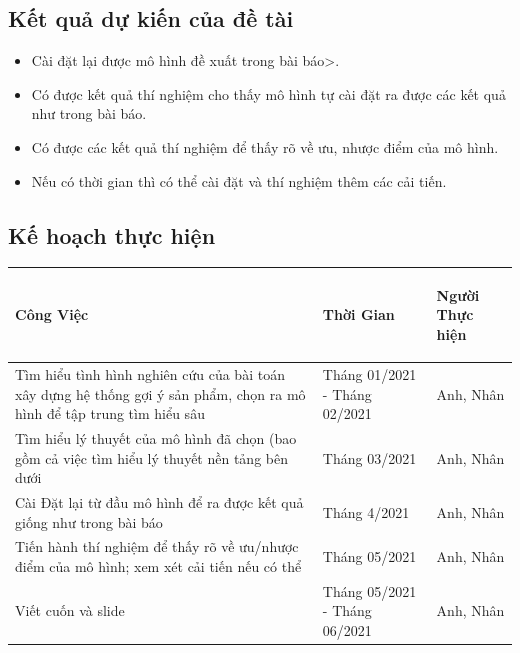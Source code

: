 \documentclass{article}[14pt]
\begin{document}
{    
    \subsection{Kết quả dự kiến của đề tài}
        
    \begin{itemize}
        \item Cài đặt lại được mô hình đề xuất trong bài báo\cite{mvae}>.
        \item Có được kết quả thí nghiệm cho thấy mô hình tự cài đặt ra được 
các kết quả như trong bài báo.
        \item Có được các kết quả thí nghiệm để thấy rõ về ưu, nhược điểm 
của mô hình.
        \item Nếu có thời gian thì có thể cài đặt và thí nghiệm thêm các cải 
tiến.
    \end{itemize}
    
    \subsection{Kế hoạch thực hiện}

\begin{tabular}{ | m{20em} | m{4cm}| m{4cm} | } 

  \hline
   \centering\textbf { Công Việc} &  \centering\textbf{Thời Gian}  & 
\begin{center}
        \textbf{Người Thực hiện}   \end{center} \\ 
  \hline
  Tìm hiểu tình hình nghiên cứu của bài toán xây dựng hệ thống gợi ý sản 
phẩm, chọn ra mô hình để tập trung tìm hiểu sâu & Tháng 01/2021 - Tháng 
02/2021 & Anh, Nhân \\ 
  \hline
  Tìm hiểu lý thuyết của mô hình đã chọn (bao gồm cả việc tìm hiểu lý thuyết 
nền tảng bên dưới &  Tháng 03/2021 & Anh, Nhân \\ 
  \hline
  Cài Đặt lại từ đầu mô hình để ra được kết quả giống như trong bài báo &  
Tháng 4/2021 & Anh, Nhân \\
  \hline
  Tiến hành thí nghiệm để thấy rõ về ưu/nhược điểm của mô hình; xem xét cải 
tiến nếu có thể &  Tháng 05/2021 & Anh, Nhân \\
  \hline
 Viết cuốn và slide &  Tháng 05/2021 - Tháng 06/2021 & Anh, Nhân \\
 \hline
\end{tabular}


   
       
    
    }
    
    
    \nocite{*}
\end{document}
